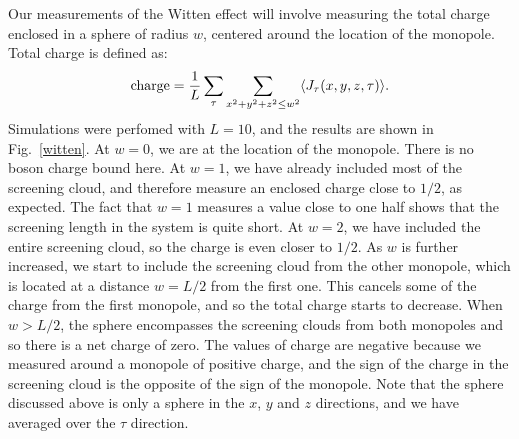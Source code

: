 \documentclass[prb,twocolumn]{revtex4-1}
\newcommand{\scripty}[1]{w}
\begin{document}
Our measurements of the Witten effect will involve measuring the total charge enclosed in a sphere of radius $\scripty{r}$, centered around the location of the monopole. Total charge is defined as:
\begin{equation}
{\rm charge}=\frac{1}{L}\sum_\tau \sum_{x^2+y^2+z^2\leq w^2} \langle J_\tau(x,y,z,\tau) \rangle.
\end{equation}
Simulations were perfomed with $L=10$, and the results are shown in Fig.~\ref{witten}.
At $\scripty{r}=0$, we are at the location of the monopole. There is no boson charge bound here. At $\scripty{r}=1$, we have already included most of the screening cloud, and therefore measure an enclosed charge close to $1/2$, as expected. The fact that $\scripty{r}=1$ measures a value close to one half shows that the screening length in the system is quite short. At $\scripty{r}=2$, we have included the entire screening cloud, so the charge is even closer to $1/2$. As $\scripty{r}$ is further increased, we start to include the screening cloud from the other monopole, which is located at a distance $\scripty{r}=L/2$ from the first one. This cancels some of the charge from the first monopole, and so the total charge starts to decrease. When $\scripty{r}>L/2$, the sphere encompasses the screening clouds from both monopoles and so there is a net charge of zero. The values of charge are negative because we measured around a monopole of positive charge, and the sign of the charge in the screening cloud is the opposite of the sign of the monopole. Note that the sphere discussed above is only a sphere in the $x$, $y$ and $z$ directions, and we have averaged over the $\tau$ direction.
\end{document}
